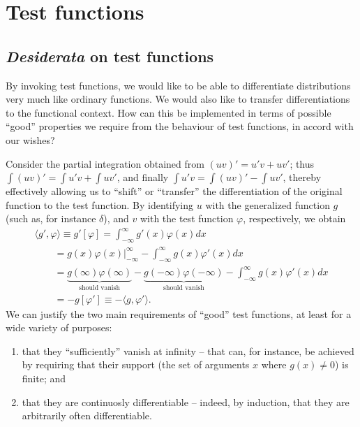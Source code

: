 \section{Test functions}

\subsection{{\it Desiderata} on test functions}

By invoking test functions, we would like to be able to differentiate distributions very much like ordinary functions.
We would also like to transfer differentiations to the functional context.
How can this be implemented in terms of possible ``good'' properties we require from the behaviour of test functions, in accord with our wishes?

Consider the partial integration
obtained from $(uv)' = u'v+uv'$; thus
$\int (uv)' = \int u'v+\int uv'$,
and finally   $\int u'v = \int (uv)'  -\int uv'$,
thereby effectively allowing us to ``shift'' or ``transfer''
the differentiation of the original function to the test function.
By identifying $u$ with the generalized function $g$ (such as, for instance  $\delta$),
and $v$ with the test function $\varphi$, respectively, we obtain
\begin{equation}
\begin{split}
\langle g' ,    \varphi  \rangle
\equiv
g'[\varphi] =
\int_{-\infty}^\infty
g'(x)\varphi(x)
dx      \\
\qquad
=
\left.
g(x)\varphi(x)\right|_{-\infty}^\infty
-  \int_{-\infty}^\infty
g(x)\varphi'(x)
dx           \\
\qquad
=
\underbrace{g(\infty)\varphi(\infty)}_{\textrm{should vanish}} - \underbrace{g(-\infty)\varphi(-\infty)}_{\textrm{should vanish}}
-  \int_{-\infty}^\infty
g(x)\varphi'(x)
dx  \\
\qquad
= - g[\varphi'] \equiv   -   \langle g ,    \varphi'  \rangle
.
\end{split}
\label{2012-m-ch-di-desiderata}
\end{equation}
We can justify the two main requirements of ``good'' test functions, at least for a wide variety of purposes:
\begin{enumerate}
\item
that they ``sufficiently'' vanish at infinity -- that can, for instance, be achieved by requiring that their support
(the set of arguments $x$ where $g(x)\neq 0$) is finite; and
\item
that they are continuosly differentiable -- indeed, by induction, that they are arbitrarily often differentiable.
\end{enumerate}

